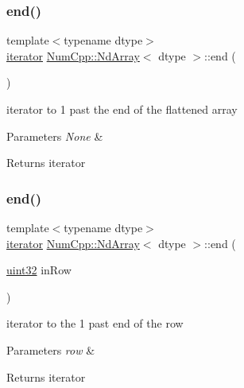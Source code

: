 \subsubsection{\texorpdfstring{end()}{end()}\hspace{0.1cm}{\footnotesize\ttfamily [1/2]}}
{\footnotesize\ttfamily template$<$typename dtype$>$ \\
\mbox{\hyperlink{class_num_cpp_1_1_nd_array_ac56493775d6c0ff556ed7d6c9e7c07b4}{iterator}} \mbox{\hyperlink{class_num_cpp_1_1_nd_array}{Num\+Cpp\+::\+Nd\+Array}}$<$ dtype $>$\+::end (\begin{DoxyParamCaption}{ }\end{DoxyParamCaption})\hspace{0.3cm}{\ttfamily [inline]}}

iterator to 1 past the end of the flattened array


\begin{DoxyParams}{Parameters}
{\em None} & \\
\hline
\end{DoxyParams}
\begin{DoxyReturn}{Returns}
iterator 
\end{DoxyReturn}
\mbox{\label{class_num_cpp_1_1_nd_array_aedaf352bf0f00435ab5fdedb9ac87e96}} 
\subsubsection{\texorpdfstring{end()}{end()}\hspace{0.1cm}{\footnotesize\ttfamily [2/2]}}
{\footnotesize\ttfamily template$<$typename dtype$>$ \\
\mbox{\hyperlink{class_num_cpp_1_1_nd_array_ac56493775d6c0ff556ed7d6c9e7c07b4}{iterator}} \mbox{\hyperlink{class_num_cpp_1_1_nd_array}{Num\+Cpp\+::\+Nd\+Array}}$<$ dtype $>$\+::end (\begin{DoxyParamCaption}\item[{\mbox{\hyperlink{namespace_num_cpp_a36f388e948380413c63011cab9b7fbd5}{uint32}}}]{in\+Row }\end{DoxyParamCaption})\hspace{0.3cm}{\ttfamily [inline]}}

iterator to the 1 past end of the row


\begin{DoxyParams}{Parameters}
{\em row} & \\
\hline
\end{DoxyParams}
\begin{DoxyReturn}{Returns}
iterator 
\end{DoxyReturn}
\mbox{\label{class_num_cpp_1_1_nd_array_a993056fafbb30dbbab8957496a5226be}} 
